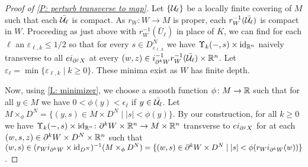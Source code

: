 \begin{proof}[Proof of \cref{P: perturb transverse to map}]
	\begin{comment}
		Let $L^K_k = \Upsilon_k(i_{\bd^k W}^{-1}(K) \times \bar D_{1/2}^N) \subset M$.
		Choosing an $X_j$ as above, we can now proceed exactly as in the precious argument, obtaining and taking the union of the resulting $A_{(w,z)} \subset W \times D_{1/2}^N \times \R^n$ over all $(w,z) \in K \times \bar B^n_0$ and intersecting with $K \times D^N \times \bar B^n_0$ gives an open neighborhood $G_j$ of $K \times 0 \times \bar B^n_0$ in $K \times D^N \times \bar B^n_0$, such that
		$\Upsilon_0(-,s) \times \id_{\R^n}$ is transverse to $ei_{\bd^j X}$ for all $(w,z) \in K \times \bar B^n_0$.
		Again we can use the Tube Lemma to find a neighborhood $U_j$ of $0$ in $D^N$ so that $K \times U_j \times \bar B^n_0 \subset G_j$, and then for every $s \in U_j$, we know that $\Upsilon_0(-,s) \times \id_{\R^n}$ is transverse to $ei_{\bd^j X}$ at every point of $K \times \R^n$, as points of $K \times \R^n$ outside of $K \times \bar B^n_0$ do not intersect $W_j$.
		Now, as above, by ranging over all of the finite options for $j$ and then similarly considering the $\bd^k W$ with subsets $i_{\bd^k W}^{-1}(K)$, maps $\Upsilon_k$, and balls $\bar B^n_k$, we can then find a neighborhood $U$ of $0$ in $D^N_{1/2}$ such that for all $s \in U$ we have $\Upsilon_k(-,s) \times \id_{\R^n}$ naively transverse to all $ei_{\bd^j X}$ at all points of $\bd^k W \times \R^n$, $k\geq 0$, that map to $K \times \R^n$ via the boundary immersions times $\id_{R^n}$.
	\end{comment}

	Let $\{\mathcal{U}_\ell\}$ be a locally finite covering of $M$ such that each $\bar{\mathcal{U}_\ell}$ is compact.
	As $r_W \colon W \to M$ is proper, each $r^{-1}_W(\bar {\mathcal{U}_\ell})$ is compact in $W$.
	Proceeding as just above with $r_W^{-1}(\bar U_\ell)$ in place of $K$, we can find for each $\ell$ an $\varepsilon_{\ell,k} \leq 1/2$ so that for every $s \in D^N_{\varepsilon_{\ell,k}}$ we have $\Upsilon_k(-,s) \times \mathrm{id}_{\mathbb{R}^n}$ naively transverse to all $ei_{\partial^j X}$ at every $(w,z) \in i_{\partial^k W}^{-1} r^{-1}_W(\bar {\mathcal{U}_\ell}) \times \mathbb{R}^n$.
	Let $\varepsilon_\ell = \min\{\varepsilon_{\ell,k} \mid k\geq 0\}$.
	These minima exist as $W$ has finite depth.

	Now, using \cref{L: minimizer}, we choose a smooth function $\phi \colon M \to \mathbb{R}$ such that for all $y \in M$ we have $0<\phi(y)<\epsilon_\ell$ if $y \in \bar{\mathcal{U}_\ell}$.
	Let $M \times_\phi D^N = \{(y,s) \in M \times D^N \mid |s|<\phi(y)\}$.
	By our construction, for all $k\geq 0$ we have $\Upsilon_k(-,s) \times \mathrm{id}_{\mathbb{R}^n} \colon \partial^k W \times \mathbb{R}^n \to M \times \mathbb{R}^n$ transverse to $ei_{\partial^j X}$ for at each $(w,s,z) \in \partial^k W \times D^N \times \mathbb{R}^n$ such that $(w,s) \in (r_Wi_{\partial^{k}W} \times \mathrm{id}_{D^N})^{-1}(M\times_\phi D^N) = \{(w,s) \in \partial^k W \times D^N \mid |s|<\phi(r_Wi_{\partial^k W}(w))\}$.


\end{proof}
